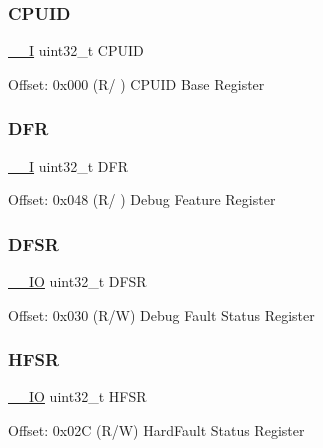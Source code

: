 \subsubsection{\texorpdfstring{C\+P\+U\+ID}{CPUID}}
{\footnotesize\ttfamily \mbox{\hyperlink{core__cm3_8h_af63697ed9952cc71e1225efe205f6cd3}{\+\_\+\+\_\+I}} uint32\+\_\+t C\+P\+U\+ID}

Offset\+: 0x000 (R/ ) C\+P\+U\+ID Base Register \mbox{\label{struct_s_c_b___type_a1b9a71780ae327f1f337a2176b777618}} 
\subsubsection{\texorpdfstring{D\+FR}{DFR}}
{\footnotesize\ttfamily \mbox{\hyperlink{core__cm3_8h_af63697ed9952cc71e1225efe205f6cd3}{\+\_\+\+\_\+I}} uint32\+\_\+t D\+FR}

Offset\+: 0x048 (R/ ) Debug Feature Register \mbox{\label{struct_s_c_b___type_a415598d9009bb3ffe9f35e03e5a386fe}} 
\subsubsection{\texorpdfstring{D\+F\+SR}{DFSR}}
{\footnotesize\ttfamily \mbox{\hyperlink{core__cm3_8h_aec43007d9998a0a0e01faede4133d6be}{\+\_\+\+\_\+\+IO}} uint32\+\_\+t D\+F\+SR}

Offset\+: 0x030 (R/W) Debug Fault Status Register \mbox{\label{struct_s_c_b___type_a87aadbc5e1ffb76d755cf13f4721ae71}} 
\subsubsection{\texorpdfstring{H\+F\+SR}{HFSR}}
{\footnotesize\ttfamily \mbox{\hyperlink{core__cm3_8h_aec43007d9998a0a0e01faede4133d6be}{\+\_\+\+\_\+\+IO}} uint32\+\_\+t H\+F\+SR}

Offset\+: 0x02C (R/W) Hard\+Fault Status Register \mbox{\label{struct_s_c_b___type_a8fec9e122b923822e7f951cd48cf1d47}} 

